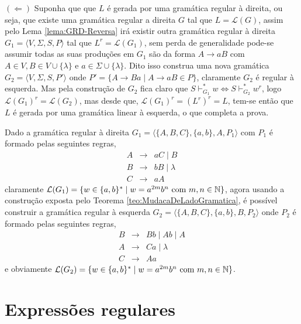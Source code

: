 \begin{prova}
	$(\Leftarrow)$ Suponha que que $L$ é gerada por uma gramática regular à direita, ou seja, que existe uma gramática regular a direita $G$ tal que $L = \mathcal{L}(G)$, assim pelo Lema \ref{lema:GRD-Reversa} irá existir outra gramática regular à direita $G_1 = \langle V, \Sigma, S, P \rangle$ tal que $L^r = \mathcal{L}(G_1)$, sem perda de generalidade pode-se assumir todas as suas produções em $G_1$ são da forma $A \rightarrow aB$ com $A \in V, B \in V \cup \{\lambda\}$ e $a \in \Sigma \cup \{\lambda\}$. Dito isso construa uma nova gramática $G_2 = \langle V, \Sigma, S, P'\rangle$ onde $P' = \{A \rightarrow Ba \mid A \rightarrow aB \in P\}$, claramente $G_2$ é regular à esquerda. Mas pela construção de $G_2$ fica claro que $S \vdash_{G_1}^* w \Longleftrightarrow S \vdash_{G_2}^* w^r$, logo $\mathcal{L}(G_1)^r = \mathcal{L}(G_2)$, mas desde que, $\mathcal{L}(G_1)^r = (L^r)^r = L$, tem-se então que $L$ é gerada por uma gramática linear à esquerda, o que completa  a prova.
\end{prova}

\begin{exemplo}
	Dado a gramática regular à direita $G_1 = \langle \{A, B, C\}, \{a, b\}, A, P_1 \rangle$ com $P_1$ é formado pelas seguintes regras,
	\begin{eqnarray*}
		A & \rightarrow & aC \mid B \\
		B & \rightarrow & bB \mid \lambda\\
		C & \rightarrow & aA
	\end{eqnarray*}
	 claramente $\mathcal{L}(G_1) = \{w \in \{a, b\}^* \mid w = a^{2m}b^n \hbox{ com } m,n \in \mathbb{N}\}$,  agora usando a construção exposta pelo Teorema \ref{teo:MudacaDeLadoGramatica}, é possível construir a gramática regular à esquerda $G_2 = \langle \{A, B, C\}, \{a, b\}, B, P_2 \rangle$ onde $P_2$ é formado pelas seguintes regras,
	 \begin{eqnarray*}
	 	B & \rightarrow & Bb \mid Ab \mid A\\
	 	A & \rightarrow & Ca \mid \lambda\\
	 	C & \rightarrow & Aa 
	 \end{eqnarray*}
	 e obviamente $\mathcal{L}(G_2) = \{w \in \{a, b\}^* \mid w = a^{2m}b^n \hbox{ com } m,n \in \mathbb{N}\}$.
\end{exemplo}

\section{Expressões regulares}\label{sec:ExpressionsRegulares}

